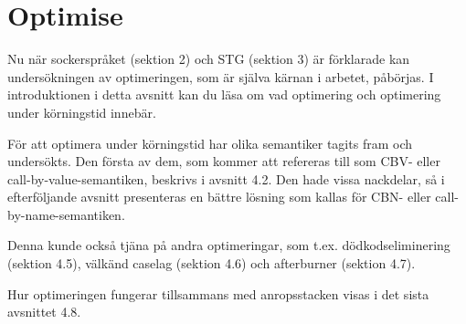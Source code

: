 \documentclass[Rapport]{subfiles}
\begin{document}
\section{Optimise}
\label{sec:Optimise}

\overviewOptimise

Nu när sockerspråket (sektion 2) och STG (sektion 3) är förklarade
kan undersökningen av optimeringen, som är själva kärnan i arbetet, påbörjas.
I introduktionen i detta avsnitt kan du läsa om vad optimering och 
optimering under körningstid innebär. 

För att optimera under körningstid har olika semantiker tagits fram och undersökts.   
Den första av dem, som kommer att refereras till som CBV- eller call-by-value-semantiken, 
beskrivs i avsnitt 4.2. Den hade vissa nackdelar, så i 
efterföljande avsnitt presenteras en bättre lösning som kallas för CBN- eller call-by-name-semantiken.

Denna kunde också tjäna på andra optimeringar, som t.ex.
dödkodseliminering (sektion 4.5), 
välkänd caselag (sektion 4.6) och 
afterburner (sektion 4.7).

Hur optimeringen fungerar tillsammans med anropsstacken visas i det sista avsnittet 4.8.


\end{document}
